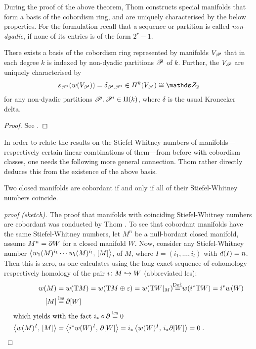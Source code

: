 During the proof of the above theorem, Thom constructs special
manifolds that form a basis of the cobordism ring,
and are uniquely characterised by the below properties.
For the formulation recall that a sequence or partition is called
\emph{non-dyadic}, if none of its entries is of the form $2^r-1$.
\begin{Thm}\label{thm:basiscobordismring}
  There exists a basis of the cobordism ring represented by manifolds
  $V_{\mathscr{P}}$ that in each degree $k$ is indexed by non-dyadic
  partitions $\mathscr{P}$ of $k$. Further, the $V_{\mathscr{P}}$ are uniquely
  characterised by
  \begin{gather*}
    \s{\Part'}(\W{V_\Part}) = \delta_{\Part,\Part'}
    \in \H^k(V_{\Part})\cong \Zmod2
  \end{gather*}
  for any non-dyadic partitions $\mathscr{P},\mathscr{P}'\in\Pi({k})$,
  where $\delta$ is the usual Kronecker delta.
  \begin{proof}
    See \cite[Section~IV.5, proof of Theorem~IV.9]{thom}.
  \end{proof}
\end{Thm}

In order to relate the results on the Stiefel-Whitney numbers of
manifolds---respectively certain linear combinations of them---from
before with cobordism classes, one needs the following more general
connection. Thom rather directly deduces this from the existence of
the above basis.
\begin{Thm}[Thom]\label{thm:cobordantiffswnumscoincide}
  Two closed manifolds are cobordant if and only if all of their
  Stiefel-Whitney numbers coincide.
  \begin{proof}[proof (sketch)]
    The proof that manifolds with coinciding Stiefel-Whitney numbers
    are cobordant was conducted by Thom \cite[Theorem IV.10]{thom}.
    To see that cobordant manifolds have the same Stiefel-Whitney
    numbers, let $M^n$ be a null-bordant closed manifold, \idest
    assume $M^n=\partial{W}$ for a closed manifold $W$. Now, consider
    any Stiefel-Whitney number 
    $\left\langle {w_{1}}(M)^{i_1}\dotsm{w_{l}}(M)^{i_l},\, [M] \right\rangle$,
    of $M$, where $I=(i_1,\dotsc,i_l)$ with $d(I)=n$.
    Then this is zero, as one calculates using the long
    exact sequence of cohomology respectively homology of the pair
    $i\colon M\hookrightarrow W$ (abbreviated les):
    \begin{align*}
      \W{M}
      &= \W{\T M}
        = \W{\T M\oplus\trivbdl}
        = \W{\T W|_{M}}
        \cequalsby{Def.} \W{\pb i \T W} = \pb i \W{W} \\
      \fundcl M
      &\cequalsby{les} \partial \fundcl{W} \\
      \intertext{which yields with the fact
      $\pf i\circ\partial\overset{\text{les}}= 0$}
      \capped{\W{M}^I}{\fundcl M}
      &= \capped{\pb i\W{W}^I}{\partial\fundcl{W}}
        = \pf i\capped{\W{W}^I}{\pf i\partial \fundcl{W}}
        = 0
        \;.
        \qedhere
    \end{align*}
  \end{proof}
\end{Thm}


